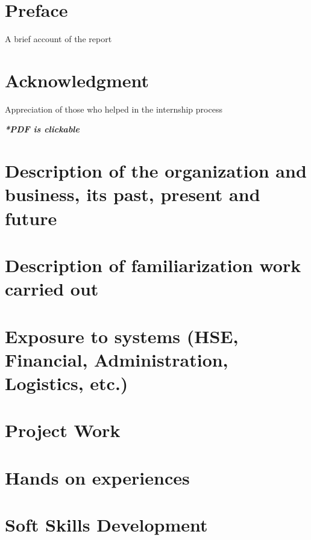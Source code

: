 \documentclass[a4paper,12pt]{report}%
\begin{document}


\chapter*{Preface}
A brief account of the report
\cleardoublepage

\chapter*{Acknowledgment}
Appreciation of those who helped in the internship process



\tableofcontents %
\listoffigures %
\listoftables %
\vfill
\begin{center}
	\textbf{\textit{*PDF is clickable}}
\end{center}


\pagebreak

\chapter{Description of the organization and business, its past, present and	future}

\chapter{Description of familiarization work carried out}

\chapter{Exposure to systems (HSE, Financial, Administration, Logistics, etc.)}

\chapter{Project Work}

\chapter{Hands on experiences}

\chapter{Soft Skills Development}
\end{document}
